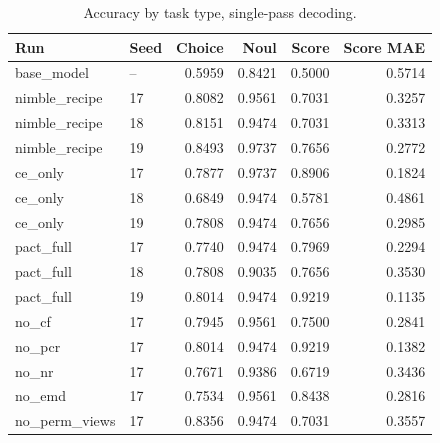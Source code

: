 
\begin{table}[t]
\centering
\small
\begin{tabular}{llrrrr}
\toprule
Run & Seed & Choice & Noul & Score & Score MAE \\
\midrule
base\_model & -- & 0.5959 & 0.8421 & 0.5000 & 0.5714 \\
nimble\_recipe & 17 & 0.8082 & 0.9561 & 0.7031 & 0.3257 \\
nimble\_recipe & 18 & 0.8151 & 0.9474 & 0.7031 & 0.3313 \\
nimble\_recipe & 19 & 0.8493 & 0.9737 & 0.7656 & 0.2772 \\
ce\_only & 17 & 0.7877 & 0.9737 & 0.8906 & 0.1824 \\
ce\_only & 18 & 0.6849 & 0.9474 & 0.5781 & 0.4861 \\
ce\_only & 19 & 0.7808 & 0.9474 & 0.7656 & 0.2985 \\
pact\_full & 17 & 0.7740 & 0.9474 & 0.7969 & 0.2294 \\
pact\_full & 18 & 0.7808 & 0.9035 & 0.7656 & 0.3530 \\
pact\_full & 19 & 0.8014 & 0.9474 & 0.9219 & 0.1135 \\
no\_cf & 17 & 0.7945 & 0.9561 & 0.7500 & 0.2841 \\
no\_pcr & 17 & 0.8014 & 0.9474 & 0.9219 & 0.1382 \\
no\_nr & 17 & 0.7671 & 0.9386 & 0.6719 & 0.3436 \\
no\_emd & 17 & 0.7534 & 0.9561 & 0.8438 & 0.2816 \\
no\_perm\_views & 17 & 0.8356 & 0.9474 & 0.7031 & 0.3557 \\
\bottomrule
\end{tabular}
\caption{Accuracy by task type, single-pass decoding.}
\label{tab:task-type}
\end{table}

